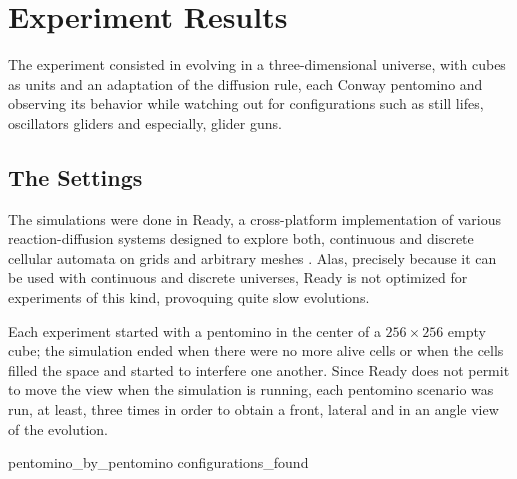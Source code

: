 

\newpage
\section{Experiment Results}

The experiment consisted in evolving in a three-dimensional universe, with cubes
as units and an adaptation of the diffusion rule, each Conway pentomino and
observing its behavior while watching out for configurations such as still
lifes, oscillators gliders and especially, glider guns.

\subsection{The Settings}
The simulations were done in Ready, a cross-platform implementation of various
reaction-diffusion systems designed to explore both, continuous and discrete
cellular automata on grids and arbitrary meshes \cite{ready-golly-gang}.
Alas, precisely because it can be used with continuous and discrete universes,
Ready is not optimized for experiments of this kind, provoquing quite slow
evolutions.

Each experiment started with a pentomino in the center of a $256\times256$ empty
cube; the simulation ended when there were no more alive cells or when the cells
filled the space and started to interfere one another. Since Ready does not
permit to move the view when the simulation is running, each pentomino scenario
was run, at least, three times in order to obtain a front, lateral and in an
angle view of the evolution.


{pentomino_by_pentomino}
{configurations_found}
